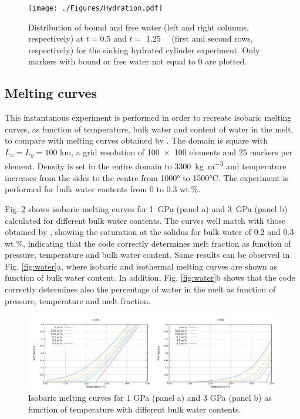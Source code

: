 \documentclass[hidelinks,11pt,a4paper]{article}
\begin{document}
\begin{figure}
\centering
\noindent\texttt{[image: ./Figures/Hydration.pdf]}
\caption{Distribution of bound and free water (left and right columns, respectively) at $t=0.5$ and $t=$ \SI{1.25}{\mega\year} (first and second rows, respectively) for the sinking hydrated cylinder experiment. Only markers with bound or free water not equal to 0 are plotted.}
\label{fig:quinquis}
\end{figure}

\subsection{Melting curves}\label{sec:katz}
This instantanous experiment is performed in order to recreate isobaric melting curves, as function of temperature, bulk water and content of water in the melt, to compare with melting curves obtained by \citet{Katz2003}. The domain is square with $L_x=L_y=100$ km, a grid resolution of \num{100x100} elements and 25 markers per element. Density is set in the entire domain to \SI{3300}{\kg\per\cubic\m} and temperature increases from the sides to the centre from 1000° to 1500°C. The experiment is performed for bulk water contents from 0 to 0.3 wt.\%.

Fig. \ref{fig:fraction} shows isobaric melting curves for \SI{1}{\giga\pascal} (panel a) and \SI{3}{\giga\pascal} (panel b) calculated for different bulk water contents. The curves well match with those obtained by \citet{Katz2003}, showing the saturation at the solidus for bulk water of 0.2 and 0.3 wt.\%, indicating that the code correctly determines melt fraction as function of pressure, temperature and bulk water content. Same results can be observed in Fig. \ref{fig:water}a, where isobaric and isothermal melting curves are shown as function of bulk water content. In addition, Fig. \ref{fig:water}b shows that the code correctly determines also the percentage of water in the melt as function of pressure, temperature and melt fraction.

\begin{figure}
\noindent\includegraphics[width=\textwidth]{./Figures/Fraction.pdf}
\caption{Isobaric melting curves for 1 GPa (panel a) and 3 GPa (panel b) as function of temperature with different bulk water contents.}
\label{fig:fraction}
\end{figure}
\end{document}
